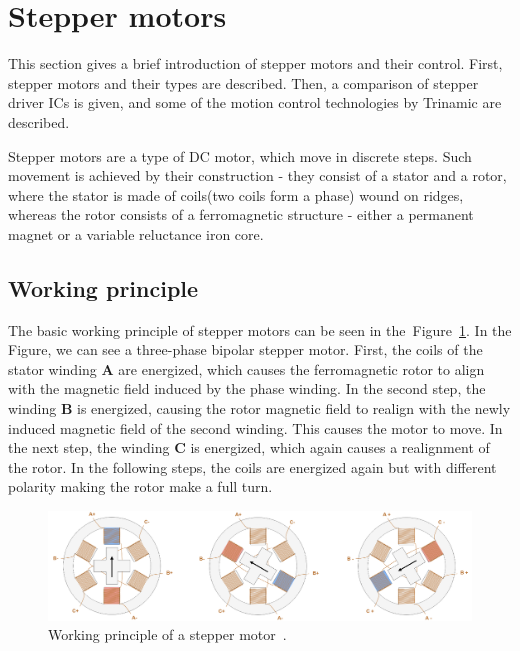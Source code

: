 \section{Stepper motors}
\label{sec:steppers}
This section gives a brief introduction of stepper motors and their control.
First, stepper motors and their types are described.
Then, a comparison of stepper driver ICs is given, and some of the motion control technologies by Trinamic are described.

Stepper motors are a type of DC motor, which move in discrete steps\cite{earl_all_nodate,carmine_fiore_stepper_2021}.
Such movement is achieved by their construction - they consist of a stator and a rotor, where the stator is made of coils(two coils form a phase) wound on ridges, whereas the rotor consists of a ferromagnetic structure - either a permanent magnet or a variable reluctance iron core\cite{carmine_fiore_stepper_2021}.

\subsection{Working principle}
\label{subsec:stepper_working_principle}
The basic working principle of stepper motors can be seen in the~Figure~\ref{fig:stepper_working_principle}.
In the Figure, we can see a three-phase bipolar stepper motor.
First, the coils of the stator winding \textbf{A} are energized, which causes the ferromagnetic rotor to align with the magnetic field induced by the phase winding.
In the second step, the winding \textbf{B} is energized, causing the rotor magnetic field to realign with the newly induced magnetic field of the second winding.
This causes the motor to move.
In the next step, the winding \textbf{C} is energized, which again causes a realignment of the rotor.
In the following steps, the coils are energized again but with different polarity making the rotor make a full turn.

\begin{figure}[H]
    \centering
    \includegraphics[width=\textwidth]{obrazky/stepper_principle}
    \caption{Working principle of a stepper motor~\cite{carmine_fiore_stepper_2021}.}
    \label{fig:stepper_working_principle}
\end{figure}

